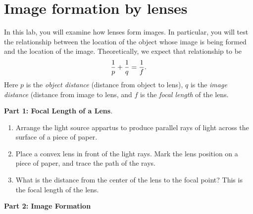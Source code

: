 \chapter{Image formation by lenses}


In this lab, you will examine how lenses form images.  In particular,
you will test the relationship between the location of the object
whose image is being formed and the location of the image.  Theoretically,
we expect that relationship to be
$$
{1\over p}+{1\over q}={1\over f}.
$$
Here $p$ is the {\it object distance} (distance from object to lens),
$q$ is the {\it image distance} (distance from image to lens, and $f$
is the {\it focal length} of the lens.

\bigskip

{\bf Part 1: Focal Length of a Lens}.

\begin{enumerate}

\item Arrange the light source appartus to produce parallel
rays of light across the surface of a piece of paper.
\item Place a convex lens in front of the
light rays.  Mark the lens position on a piece of paper, and trace
the path of the rays.
\item What is the distance from the center of the lens to the focal
point?  This is the focal length of the lens.

\vskip 1in

\end{enumerate}

\bigskip

{\bf Part 2: Image Formation}

